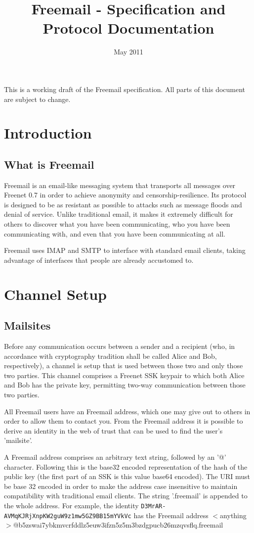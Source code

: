 \documentclass[12pt,a4paper]{article}
\begin{document}
\title{Freemail - Specification and Protocol Documentation}
\date{May 2011}
\maketitle

This is a working draft of the Freemail specification. All parts of this document are subject to
change.

\section{Introduction}
\subsection{What is Freemail}
Freemail is an email-like messaging system that transports all messages over Freenet 0.7 in order to
achieve anonymity and censorship-resilience. Its protocol is designed to be as resistant as possible
to attacks such as message floods and denial of service. Unlike traditional email, it makes it
extremely difficult for others to discover what you have been communicating, who you have been
communicating with, and even that you have been communicating at all.

Freemail uses IMAP and SMTP to interface with standard email clients, taking advantage of interfaces
that people are already accustomed to.

\section{Channel Setup}
\subsection{Mailsites}
Before any communication occurs between a sender and a recipient (who, in accordance with
cryptography tradition shall be called Alice and Bob, respectively), a channel is setup that is used
between those two and only those two parties. This channel comprises a Freenet SSK keypair to which
both Alice and Bob has the private key, permitting two-way communication between those two parties.

All Freemail users have an Freemail address, which one may give out to others in order to allow them
to contact you. From the Freemail address it is possible to derive an identity in the web of trust
that can be used to find the user's 'mailsite'.

A Freemail address comprises an arbitrary text string, followed by an '@' character. Following this
is the base32 encoded representation of the hash of the public key (the first part of an SSK is
this value base64 encoded). The URI must be base 32 encoded in order to make the address case
insensitive to maintain compatibility with traditional email clients. The string '.freemail' is
appended to the whole address. For example, the identity \verb|D3MrAR-AVMqKJRjXnpKW2guW9z1mw5GZ9BB15mYVkVc|
has the Freemail address $<$anything$>$@b5zswai7ybkmvcrfddlz5euw3ifzn5z5m3bzdgpucb26mzqvsflq.freemail
\end{document}
